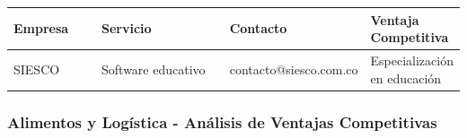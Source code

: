 \documentclass[letterpaper, 11pt]{report}
\begin{document}
\begin{longtable}{|p{0.2\linewidth}|p{0.3\linewidth}|p{0.3\linewidth}|p{0.2\linewidth}|}
      \hline
      \textbf{Empresa} & \textbf{Servicio}  & \textbf{Contacto}      & \textbf{Ventaja Competitiva} \\
      \hline
      SIESCO           & Software educativo & contacto@siesco.com.co &
      Especialización en educación                                                                  \\\hline

\end{longtable}

\subsubsection{Alimentos y Logística - Análisis de Ventajas Competitivas}
\end{document}

